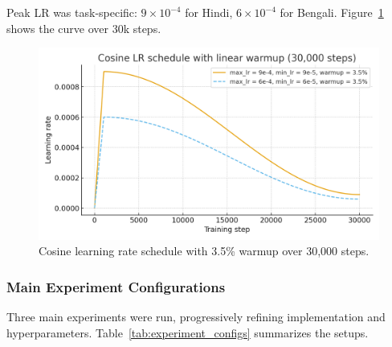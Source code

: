 \documentclass[11pt, oneside]{article}   	%
\begin{document}
Peak LR was task-specific: $9\times10^{-4}$ for Hindi, $6\times10^{-4}$ for Bengali.  
Figure~\ref{fig:lrshape} shows the curve over 30k steps.

\begin{figure}[h]
    \centering
    \includegraphics[width=0.75\linewidth]{eda/lr_schedule_30k.png}
    \caption{Cosine learning rate schedule with 3.5\% warmup over 30,000 steps.}
    \label{fig:lrshape}
\end{figure}

\subsubsection{Main Experiment Configurations}  
Three main experiments were run, progressively refining implementation and hyperparameters. Table~\ref{tab:experiment_configs} summarizes the setups.

\begin{table}[h]
\centering
\caption{Main Experiment Configurations}
\label{tab:experiment_configs}
\end{table}
\end{document}
